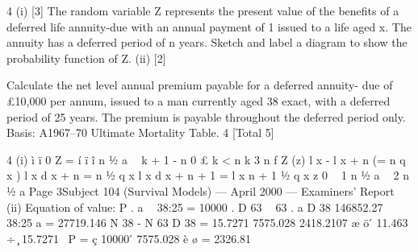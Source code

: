 \documentclass[a4paper,12pt]{article}
\begin{document}
4
(i)
[3]
The random variable Z represents the present value of the benefits of a
deferred life annuity-due with an annual payment of 1 issued to a life
aged x. The annuity has a deferred period of n years.
Sketch and label a diagram to show the probability function of Z.
(ii)
[2]



Calculate the net level annual premium payable for a deferred annuity-
due of £10,000 per annum, issued to a man currently aged 38 exact, with
a deferred period of 25 years. The premium is payable throughout the
deferred period only.
Basis: A1967–70 Ultimate Mortality Table. 4%
[Total 5]


4
(i)
ì
ï 0
Z = í
ï
î n 1⁄2 a  k + 1 - n
0 £ k < n
k 3 n
f Z (z)
l x - l x + n
(= n q x )
l x
d x + n
= n 1⁄2 q x
l x
d x + n + 1
=
l x
n + 1 1⁄2 q x
z
0
 1
n 1⁄2 a
 2
n 1⁄2 a
Page 3Subject 104 (Survival Models) — April 2000 — Examiners’ Report
(ii)
Equation of value:
P . a  38:25
= 10000 .
D 63
 63
. a
D 38
146852.27
 38:25
a
=
27719.146
N 38 - N 63
D 38
= 15.7271
7575.028
2418.2107
æ
ö
 ́ 11.463 ÷  ̧ 15.7271
\ P = ç 10000  ́
7575.028
è
ø
= 2326.81
\end{document}
